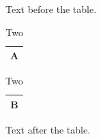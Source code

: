 \documentclass{article}
\begin{document}
Text before the table.

\begin{table}[h]\centering\begin{tabular}{|l|}\hline A\\\hline\end{tabular}\hfill\begin{tabular}{|r|}\hline B\\\hline\end{tabular}\caption{Two}\label{t:two}\end{table}

Text after the table.
\end{document}
